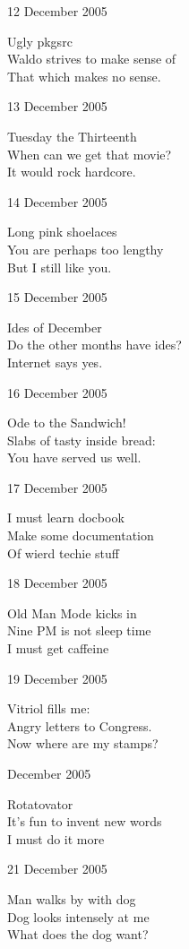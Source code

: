 \documentclass[12pt]{article}
\begin{document}
12 December 2005

Ugly pkgsrc \\
Waldo strives to make sense of \\
That which makes no sense. 

13 December 2005

Tuesday the Thirteenth \\
When can we get that movie? \\
It would rock hardcore. 

\newpage

14 December 2005

Long pink shoelaces \\
You are perhaps too lengthy \\
But I still like you. 

15 December 2005

Ides of December \\
Do the other months have ides? \\
Internet says yes. 

16 December 2005

Ode to the Sandwich! \\
Slabs of tasty inside bread: \\
You have served us well. 

17 December 2005

I must learn docbook \\
Make some documentation \\
Of wierd techie stuff 

18 December 2005 

Old Man Mode kicks in \\
Nine PM is not sleep time \\
I must get caffeine

19 December 2005

Vitriol fills me: \\
Angry letters to Congress. \\
Now where are my stamps?

 December 2005

Rotatovator \\
It's fun to invent new words \\
I must do it more 

21 December 2005

Man walks by with dog \\
Dog looks intensely at me \\
What does the dog want? 
\end{document}
